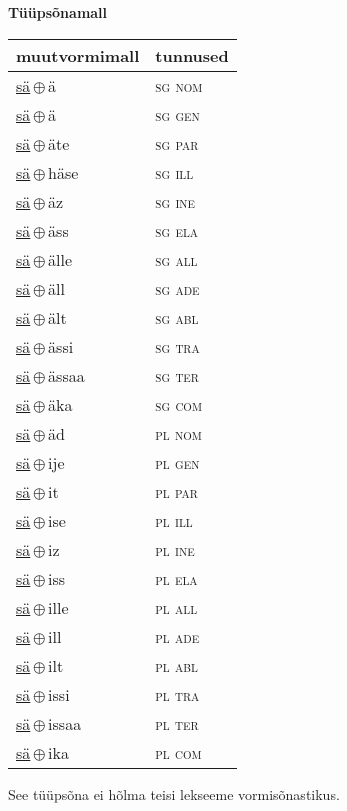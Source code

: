 

\vspace{3.5em}
\noindent \begin{minipage}{\textwidth}
\noindent \textbf{Tüüpsõnamall \,}\\

\begin{sideways}
\begin{tabular}{l l}
muutvormimall & tunnused \\
\hline
\underline{sä}\,$\oplus$\,ä & \textsc{ sg nom } \\
\underline{sä}\,$\oplus$\,ä & \textsc{ sg gen } \\
\underline{sä}\,$\oplus$\,äte & \textsc{ sg par } \\
\underline{sä}\,$\oplus$\,häse & \textsc{ sg ill } \\
\underline{sä}\,$\oplus$\,äz & \textsc{ sg ine } \\
\underline{sä}\,$\oplus$\,äss & \textsc{ sg ela } \\
\underline{sä}\,$\oplus$\,älle & \textsc{ sg all } \\
\underline{sä}\,$\oplus$\,äll & \textsc{ sg ade } \\
\underline{sä}\,$\oplus$\,ält & \textsc{ sg abl } \\
\underline{sä}\,$\oplus$\,ässi & \textsc{ sg tra } \\
\underline{sä}\,$\oplus$\,ässaa & \textsc{ sg ter } \\
\underline{sä}\,$\oplus$\,äka & \textsc{ sg com } \\
\underline{sä}\,$\oplus$\,äd & \textsc{ pl nom } \\
\underline{sä}\,$\oplus$\,ije & \textsc{ pl gen } \\
\underline{sä}\,$\oplus$\,it & \textsc{ pl par } \\
\underline{sä}\,$\oplus$\,ise & \textsc{ pl ill } \\
\underline{sä}\,$\oplus$\,iz & \textsc{ pl ine } \\
\underline{sä}\,$\oplus$\,iss & \textsc{ pl ela } \\
\underline{sä}\,$\oplus$\,ille & \textsc{ pl all } \\
\underline{sä}\,$\oplus$\,ill & \textsc{ pl ade } \\
\underline{sä}\,$\oplus$\,ilt & \textsc{ pl abl } \\
\underline{sä}\,$\oplus$\,issi & \textsc{ pl tra } \\
\underline{sä}\,$\oplus$\,issaa & \textsc{ pl ter } \\
\underline{sä}\,$\oplus$\,ika & \textsc{ pl com } \\
\end{tabular}
\end{sideways}
\label{tab:tüüpsõnamall-sää}

\end{minipage}

 
\vspace{1em}
\noindent See tüüpsõna ei hõlma teisi lekseeme vormi\-sõnastikus.
